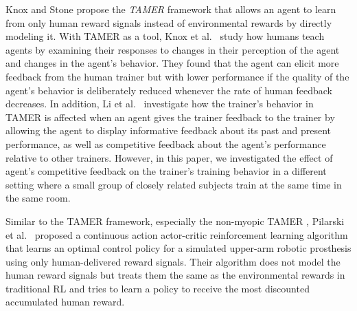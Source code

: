\documentclass[10pt,journal,compsoc]{IEEEtran}
\begin{document}
Knox and Stone \cite{knox2009interactively} propose the \emph{TAMER} framework that allows an agent to learn from only human reward signals instead of environmental rewards 
by directly modeling it. %
With TAMER as a tool, Knox et al.\ \cite{knox2012humans} study how humans teach agents by examining their responses to changes in their perception of the agent and changes in 
the agent's behavior. They found that the agent can elicit more feedback from the human trainer but with lower performance if the quality of the agent's behavior is deliberately reduced whenever the rate of human feedback decreases. 
In addition, Li et al.\ \cite{li2013using,li2014learning} investigate how the trainer's behavior in TAMER is affected when an agent gives the trainer feedback to the trainer by allowing the agent to display informative feedback 
about its past and present performance, as well as competitive feedback about the agent's performance relative to other trainers. However, in this paper, we investigated the effect of agent's competitive feedback on the trainer's training behavior in a different setting where a small group of closely related subjects train at the same time in the same room. %

Similar to the TAMER framework, especially the non-myopic TAMER \cite{knox2015framing}, Pilarski et al.\ \cite{pilarski2011online} proposed a continuous action actor-critic reinforcement learning algorithm \cite{grondman2012survey} that learns an optimal control policy for a simulated upper-arm robotic prosthesis using only human-delivered reward signals. Their algorithm does not model the human reward signals but treats them the same as the environmental rewards in traditional RL and tries to learn a policy to receive the most discounted accumulated human reward.
\end{document}
